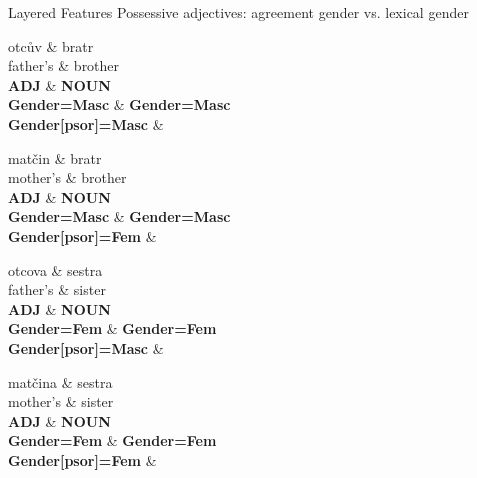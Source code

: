 \documentclass[10pt, compress, aspectratio=169]{beamer}
\newcommand{\upos}[1]{\textbf{\color{blue}#1}}
\newcommand{\feat}[1]{\textbf{\footnotesize\color{red}#1}}
\begin{document}
\begin{frame}{Layered Features}
Possessive adjectives: agreement gender vs. lexical gender

\begin{dependency}[label style={thick, font=\bfseries}]
\begin{deptext}[font=\bfseries]
otcův    \& bratr \\
father's \& brother \\
\upos{ADJ} \& \upos{NOUN} \\
\feat{Gender=Masc} \& \feat{Gender=Masc} \\
\feat{Gender[psor]=Masc} \& \\
\end{deptext}
\end{dependency}
\hspace{1cm}
\begin{dependency}[label style={thick, font=\bfseries}]
\begin{deptext}[font=\bfseries]
matčin   \& bratr \\
mother's \& brother \\
\upos{ADJ} \& \upos{NOUN} \\
\feat{Gender=Masc} \& \feat{Gender=Masc} \\
\feat{Gender[psor]=Fem} \& \\
\end{deptext}
\end{dependency}

\begin{dependency}[label style={thick, font=\bfseries}]
\begin{deptext}[font=\bfseries]
otcova   \& sestra \\
father's \& sister \\
\upos{ADJ} \& \upos{NOUN} \\
\feat{Gender=Fem} \& \feat{Gender=Fem} \\
\feat{Gender[psor]=Masc} \& \\
\end{deptext}
\end{dependency}
\hspace{1cm}
\begin{dependency}[label style={thick, font=\bfseries}]
\begin{deptext}[font=\bfseries]
matčina  \& sestra \\
mother's \& sister \\
\upos{ADJ} \& \upos{NOUN} \\
\feat{Gender=Fem} \& \feat{Gender=Fem} \\
\feat{Gender[psor]=Fem} \& \\
\end{deptext}
\end{dependency}
\end{frame}
\end{document}
